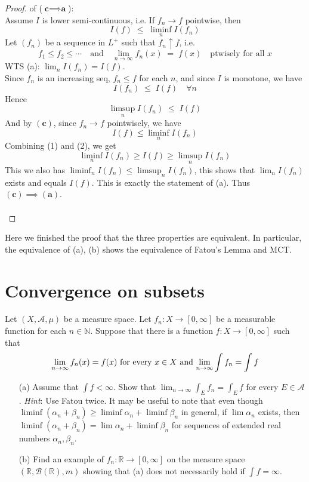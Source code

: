 \documentclass[lang=cn,11pt]{elegantbook}
\begin{document}
\begin{proof}
of (\(\textbf{c} \implies \textbf{a}\)): \\
Assume $I$ is lower semi-continuous, i.e.  If \(f_n \to f\) pointwise, then \[
    I(f) \;\le\; \liminf_{n} I(f_n)
  \] Let \((f_n)\) be a sequence in \(L^+\) such that \(f_n \uparrow f\), i.e. \[
  f_1 \le f_2 \le \cdots
  \quad\text{and}\quad
  \lim_{n\to\infty} f_n(x) \;=\; f(x) \quad\text{ptwisely for all }x
\]
WTS (a): \(\lim_{n} I(f_n) = I(f)\). \\

Since $f_n$ is an increasing seq, \(f_n \le f\) for each $n$, and since \(I\) is monotone, we have \[
     I(f_n) \;\le\; I(f)
     \quad \forall n
   \]
Hence \[\limsup_{n} I(f_n) \;\le\;I(f) \]
And by \(\mathbf{(c)}\), since \(f_n \to f\) pointwisely, we have \[I(f) \le \liminf_{n} I(f_n)\]
Combining (1) and (2), we get
\[
  \liminf_{n} I(f_n)
  \ge I(f) \ge
  \limsup_{n} I(f_n)
\]
This we also has $ \liminf_{n} I(f_n) \leq 
  \limsup_{n} I(f_n)$, this shows that \(\lim_{n} I(f_n)\) exists and equals \(I(f)\).  This is exactly the statement of (a). Thus \(\mathbf{(c)} \implies \mathbf{(a)}\).\\\\
\end{proof}
Here we finished the proof that the three properties are equivalent. In particular, the equivalence of (a), (b) shows the equivalence of Fatou's Lemma and MCT.



\section{Convergence on subsets}
  Let $(X, \mathcal{A}, \mu)$ be a measure space. Let $f_n\colon X\to [0, \infty]$ be a measurable function for each $n\in \mathbb{N}$. 
Suppose that there is a function $f\colon X\to [0, \infty]$ such that 
\[
  \text{$\lim_{n\to \infty} f_n(x) = f(x)$ for every $x\in X$ and 
    $ \lim_{n\to \infty} \int f_n  = \int f$}
\]
\begin{itemize}
\item[(a)] Assume that $ \int f<\infty$. Show that $ \lim_{n\to \infty} \int_E f_n =\int_E f$ for every $E\in \mathcal{A}$. 
\textit{Hint}: Use Fatou twice. %
It may be useful to note that even though $\liminf (\alpha_n+\beta_n)\ge \liminf \alpha_n + \liminf \beta_n$ in general, if $\lim \alpha_n$ exists, then $\liminf (\alpha_n+\beta_n)=  \lim \alpha_n + \liminf \beta_n$ for sequences of extended real numbers $\alpha_n, \beta_n$.

\item[(b)]Find an example of $f_n\colon \mathbb{R}\to [0, \infty]$ on the measure space $(\mathbb{R}, \mathcal{B}(\mathbb{R}), m)$ showing that (a) does not necessarily hold if $ \int f=\infty$.
\end{itemize}
\end{document}
